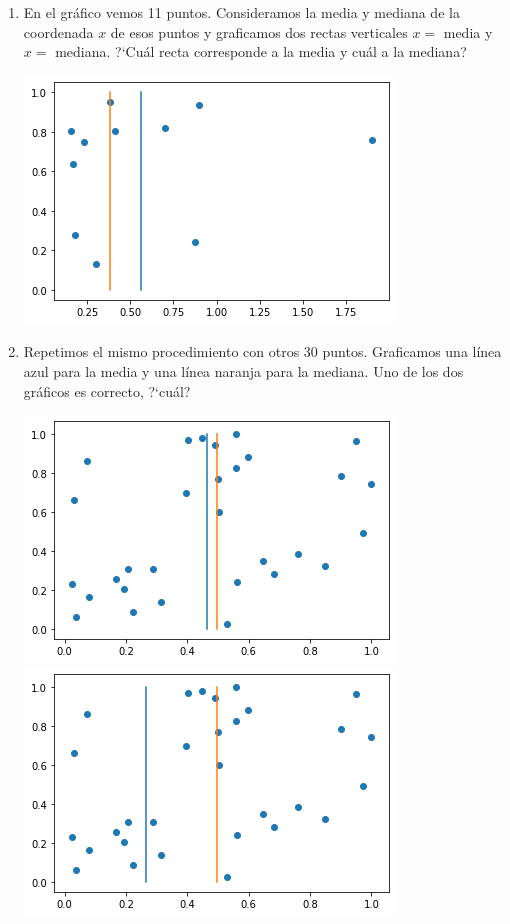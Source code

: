 \documentclass[a4paper,11pt]{article}
\theoremstyle{definition}
\begin{document}
\begin{enumerate}[resume]
\item En el gr\'afico vemos 11 puntos. Consideramos la media y mediana de la coordenada $x$ de esos puntos y graficamos dos rectas verticales $x = $ media y $x = $ mediana. ?`Cu\'al recta corresponde a la media y cu\'al a la mediana?

\begin{center}
\includegraphics[scale=0.6]{practica2-img-media_mediana_1.png}
\end{center}

\item Repetimos el mismo procedimiento con otros 30 puntos. Graficamos una l\'inea azul para la media y una l\'inea naranja para la mediana. Uno de los dos gr\'aficos es correcto, ?`cu\'al?

\begin{center}
\includegraphics[scale=0.5]{practica2-img-media_mediana_2.png}
\includegraphics[scale=0.5]{practica2-img-media_mediana_3.png}
\end{center}



\end{enumerate}
\end{document}
